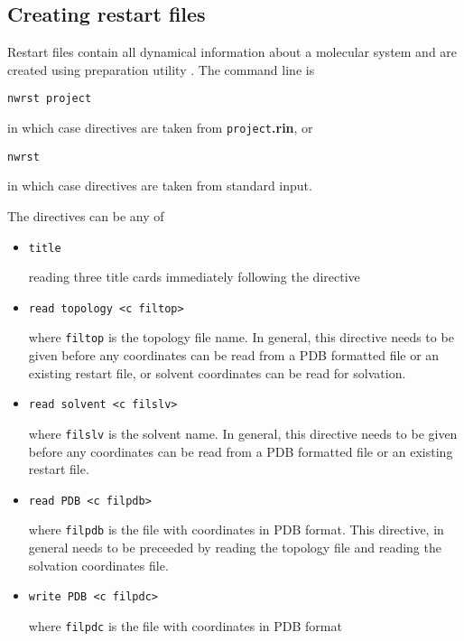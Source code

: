 \subsection{Creating restart files}
\label{nwrst}
Restart files contain all dynamical information about a molecular
system and are created using preparation utility \nwrst. The command
line is
\begin{verbatim}
nwrst project
\end{verbatim}
in which case directives are taken from {\tt project}{\bf.rin}, or
\begin{verbatim}
nwrst
\end{verbatim}
in which case directives are taken from standard input.
\par
The directives can be any of
\begin{itemize}

\item
\begin{verbatim}
title
\end{verbatim}
reading three title cards immediately following the directive

\item
\begin{verbatim}
read topology <c filtop>
\end{verbatim}
where {\tt filtop} is the topology file name. In general, this
directive needs to be given before any coordinates can be read from a
PDB formatted file or an existing restart file, or solvent coordinates
can be read for solvation.

\item
\begin{verbatim}
read solvent <c filslv>
\end{verbatim}
where {\tt filslv} is the solvent name. In general, this directive
needs to be given before any coordinates can be read from a PDB
formatted file or an existing restart file.

\item
\begin{verbatim}
read PDB <c filpdb>
\end{verbatim}
where {\tt filpdb} is the file with coordinates in PDB format. This
directive, in general needs to be preceeded by reading the topology
file and reading the solvation coordinates file.

\item
\begin{verbatim}
write PDB <c filpdc>
\end{verbatim}
where {\tt filpdc} is the file with coordinates in PDB format


\end{itemize}
